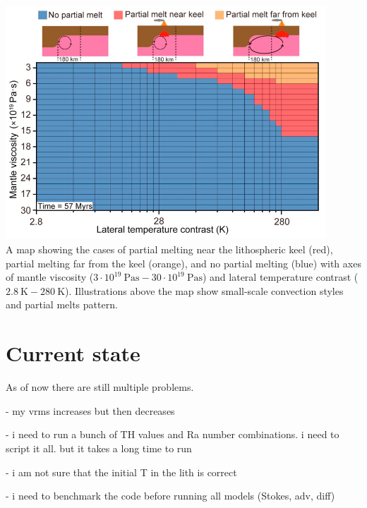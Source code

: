 \begin{center}
\includegraphics[width=12cm]{python_codes/fieldstone_168/images/kiso20f.jpg}\\
{\captionfont A map showing the cases of partial melting
near the lithospheric keel (red), partial melting far
from the keel (orange), and no partial melting (blue)
with axes of mantle viscosity ($3\cdot 10^{19}~\si{\pascal\second}- 30\cdot 10^{19}~\si{\pascal\second}$) 
and lateral temperature contrast ($2.8~\si{\kelvin}-280~\si{\kelvin}$). 
Illustrations above the map show small-scale convection styles and partial melts pattern.}
\end{center}





\section*{Current state}

As of now there are still multiple problems. 

- my vrms increases but then decreases

- i need to run a bunch of TH values and Ra number combinations. i need to script it all. but it takes a long time to run

- i am not sure that the initial T in the lith is correct

- i need to benchmark the code before running all models (Stokes, adv, diff)




